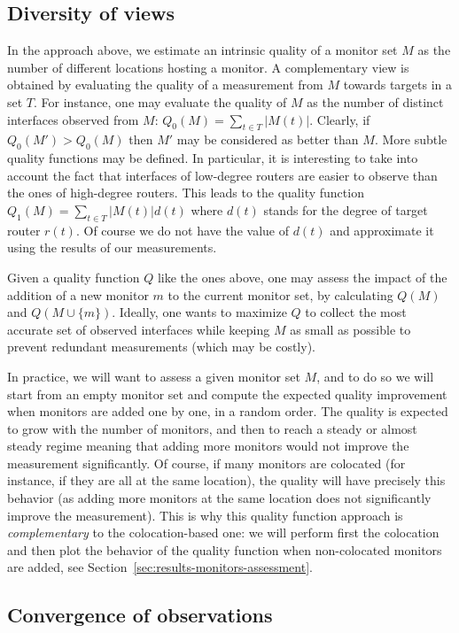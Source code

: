 \documentclass[conference]{IEEEtran}
\begin{document}
\subsection{Diversity of views}
\label{sec:diversity-of-view}

In the approach above, we estimate an intrinsic quality of a monitor set $M$ as the number of different locations hosting a monitor. A complementary view is obtained by evaluating the quality of a measurement from $M$ towards targets in a set $T$. For instance, one may evaluate the quality of $M$ as the number of distinct interfaces observed from $M$: $Q_0(M) = \sum_{t\in T} |M(t)|$. Clearly, if $Q_0(M') > Q_0(M)$ then $M'$ may be considered as better than $M$. More subtle quality functions may be defined. In particular, it is interesting to take into account the fact that interfaces of low-degree routers are easier to observe than the ones of high-degree routers. This leads to the quality function $Q_1(M) = \sum_{t \in T} |M(t)| d(t)$ where $d(t)$ stands for the degree of target router $r(t)$. Of course we do not have the value of $d(t)$ and approximate it using the results of our measurements.

Given a quality function $Q$ like the ones above, one may assess the impact of the addition of a new monitor $m$ to the current monitor set, by calculating $Q(M)$ and $Q(M \cup \{m\})$. Ideally, one wants to maximize $Q$ to collect the most accurate set of observed interfaces while keeping $M$ as small as possible to prevent redundant measurements (which may be costly).

In practice, we will want to assess a given monitor set $M$, and to do so we will start from an empty monitor set and compute the expected quality improvement when monitors are added one by one, in a random order. The quality is expected to grow with the number of monitors, and then to reach a steady or almost steady regime meaning that adding more monitors would not improve the measurement significantly. Of course, if many monitors are colocated (for instance, if they are all at the same location), the quality will have precisely this behavior (as adding more monitors at the same location does not significantly improve the measurement). This is why this quality function approach is {\em complementary} to the colocation-based one: we will perform first the colocation and then plot the behavior of the quality function when non-colocated monitors are added, see Section~\ref{sec:results-monitors-assessment}.

\subsection{Convergence of observations}
\label{sec:convergence}
\end{document}
